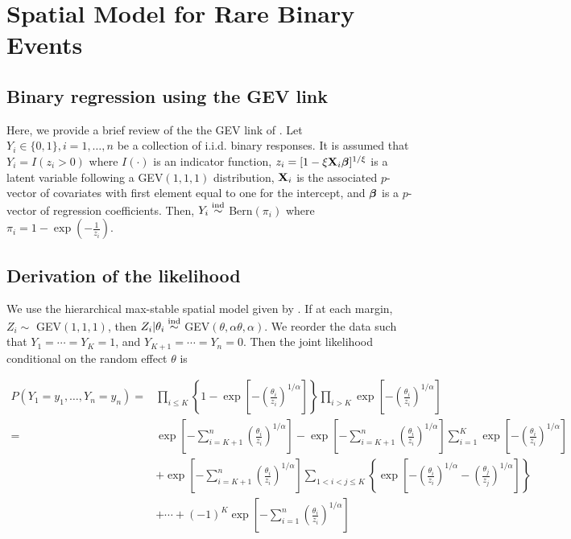 \chapter{Spatial Model for Rare Binary Events}
\label{appendix:b}

\section{Binary regression using the GEV link} \label{rba:rarebinary}
Here, we provide a brief review of the the GEV link of \citet{Wang2010}.
Let $Y_i \in \{0, 1\}, i = 1, \ldots, n$ be a collection of i.i.d. binary responses.
It is assumed that $Y_i = I(z_i > 0)$ where $I(\cdot)$ is an indicator function, $z_i = [1 - \xi \mathbf{X}_i \mbox{\boldmath $\beta$}]^{1 / \xi}$ is a latent variable following a GEV$(1, 1, 1)$ distribution, $\mathbf{X}_i$ is the associated $p$-vector of covariates with first element equal to one for the intercept, and $\mbox{\boldmath $\beta$}$ is a $p$-vector of regression coefficients.
Then, $Y_i \stackrel{\mathrm{ind}}{\sim}$ Bern$(\pi_i)$ where $\pi_i= 1 - \exp \left( -\frac{ 1 }{ z_i } \right)$.


\section{Derivation of the likelihood} \label{rba:likelihoodderivation}
We use the hierarchical max-stable spatial model given by \citet{Reich2012}. If at each margin, $Z_i \sim $ GEV$(1,1,1)$, then $Z_i | \theta_i \stackrel{\mathrm{ind}}{\sim} $ GEV$(\theta, \alpha \theta, \alpha)$. We reorder the data such that $Y_1=\cdots=Y_K=1$, and $Y_{K+1} = \cdots = Y_n = 0$. Then the joint likelihood conditional on the random effect $\theta$ is

\begin{align} \label{rbeq:joint_cond}
  P(Y_1=y_1,\ldots,Y_n=y_n) =& \prod_{ i \le K } \left\{ 1 - \exp \left[ - \left( \frac{ \theta_i }{ z_i } \right)^{ 1/\alpha} \right] \right \} \prod_{ i > K } \exp \left[ -\left( \frac{ \theta_i }{ z_i } \right)^{1/\alpha} \right] \nonumber \\[0.5em]
    =& \exp \left[ -\sum_{ i = K+1}^{ n }\left( \frac{ \theta_i }{ z_i } \right)^{1/\alpha} \right] - \exp \left[ -\sum_{ i = K+1}^{ n }\left( \frac{ \theta_i }{ z_i } \right)^{1/\alpha} \right] \sum_{ i = 1}^{K} \exp\left[ -\left( \frac{ \theta_i }{ z_i } \right)^{ 1/\alpha} \right] \nonumber\\
    &  + \exp \left[ -\sum_{ i = K+1}^{ n }\left( \frac{ \theta_i }{ z_i } \right)^{1/\alpha} \right] \sum_{ 1 < i < j \le K } \left\{ \exp \left[ - \left( \frac{ \theta_i }{ z_i } \right)^{ 1/\alpha} - \left( \frac{ \theta_j }{ z_j } \right)^{ 1/\alpha } \right] \right \} \nonumber \\[0.5em]
    & + \cdots + (-1)^K \exp\left[ - \sum_{ i = 1 }^{ n }\left( \frac{ \theta_i }{ z_i } \right)^{ 1/\alpha} \right]
\end{align}

